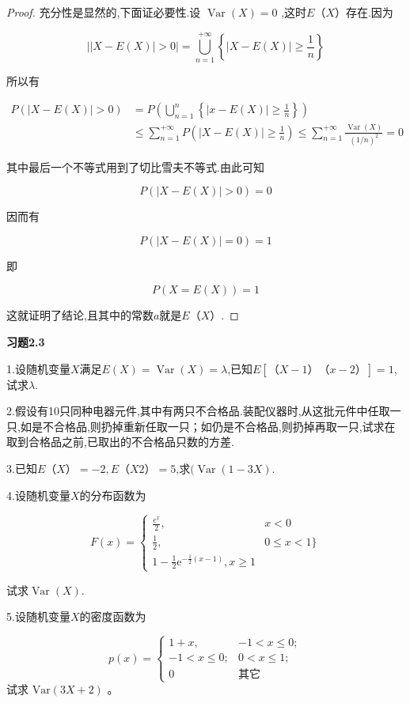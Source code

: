 \begin{proof}
	充分性是显然的,下面证必要性.设 $\operatorname{Var}(X)=0$ ,这时$ E（X） $存在.因为
	
	\[
	| | X-E(X)|>0|=\bigcup_{n=1}^{+\infty}\left\{|X-E(X)| \geqslant \frac{1}{n}\right\}
	\]
	
	所以有
	
	\[
	\begin{aligned} P(|X-E(X)|>0) &=P\left(\bigcup_{n=1}^{n}\left\{|x-E(X)| \geqslant \frac{1}{n}\right\}\right) \\ & \leqslant \sum_{n=1}^{+\infty} P\left(|X-E(X)| \geqslant \frac{1}{n}\right) \leqslant \sum_{n=1}^{+\infty} \frac{\operatorname{Var}(X)}{(1 / n)^{2}}=0 \end{aligned}
	\]
	
	其中最后一个不等式用到了切比雪夫不等式.由此可知
	
	\[
	P(|X-E(X)|>0)=0
	\]
	
	因而有
	
	\[
	P(|X-E(X)|=0)=1
	\]
	
	即
	
	\[
	P(X=E(X))=1
	\]
	
	这就证明了结论,且其中的常数$ a $就是$ E（X） $.
\end{proof}

\begin{center}
	\textbf{习题2.3}
\end{center}

1.设随机变量$ X $满足$E(X)=\operatorname{Var}(X)=\lambda$,已知$ E[（X-1）（x-2）]=1 $,试求$\lambda$.

2.假设有10只同种电器元件,其中有两只不合格品.装配仪器时,从这批元件中任取一只,如是不合格品,则扔掉重新任取一只；如仍是不合格品,则扔掉再取一只,试求在取到合格品之前,已取出的不合格品只数的方差.

3.已知$ E（X）=-2,E（X2）=5 $,求$(\operatorname{Var}(1-3 X)$.

4.设随机变量$ X $的分布函数为

\[
F(x)=\left\{\begin{array}{ll}{\frac{e^{x}}{2},} & {x<0} \\ {\frac{1}{2},} & {0 \leqslant x<1 \}} \\ {1-\frac{1}{2} \mathrm{e}^{-\frac{1}{2}(x-1)}, x \geqslant 1}\end{array}\right.
\]

试求$\operatorname{Var}(X)$.

5.设随机变量$ X $的密度函数为

\[
p(x)=\left\{\begin{array}{ll}
{1+x,} & {-1<x \leqslant 0 ;} \\ 
{-1<x \leqslant 0 ;} & {0<x \leqslant 1 ;} \\ 
{0} & {\text{其它}}
\end{array}\right.
\]
试求 $\mathrm{Var}(3 X+2)$ 。

